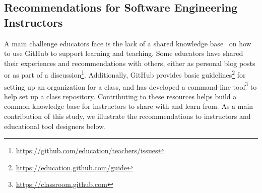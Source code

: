 \subsection{Recommendations for Software Engineering Instructors}

A main challenge educators face is the lack of a shared knowledge base~\cite{zagalsky2015emergence} on how to use GitHub to support learning and teaching. Some educators have shared their experiences and recommendations with others, either as personal blog posts or as part of a discussion\footnote{\url{https://github.com/education/teachers/issues}}. Additionally, GitHub provides basic guidelines\footnote{\url{https://education.github.com/guide}} for setting up an organization for a class, and has developed a command-line tool\footnote{\url{https://classroom.github.com}} to help set up a class repository. Contributing to these resources helps build a common knowledge base for instructors to share with and learn from. As a main contribution of this study, we illustrate the recommendations to instructors and educational tool designers below.

